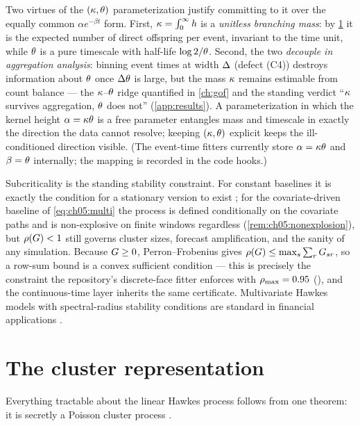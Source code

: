 Two virtues of the $(\kappa,\theta)$ parameterization justify committing
to it over the equally common $\alpha e^{-\beta t}$ form. First,
$\kappa = \int_0^\infty h$ is a \emph{unitless branching mass}: by
\cref{ch05:sec:cluster} it is the expected number of direct offspring per
event, invariant to the time unit, while $\theta$ is a pure timescale with
half-life $\log 2/\theta$. Second, the two \emph{decouple in aggregation
analysis}: binning event times at width $\Delta$ (defect (C4)) destroys
information about $\theta$ once $\Delta\theta$ is large, but the mass
$\kappa$ remains estimable from count balance --- the
$\kappa$--$\theta$ ridge quantified in \cref{ch:gof} and the standing
verdict ``$\kappa$ survives aggregation, $\theta$ does not''
(\cref{app:results}). A parameterization in which the kernel height
$\alpha = \kappa\theta$ is a free parameter entangles mass and timescale
in exactly the direction the data cannot resolve; keeping
$(\kappa,\theta)$ explicit keeps the ill-conditioned direction visible.
(The event-time fitters currently store $\alpha=\kappa\theta$ and $\beta
= \theta$ internally; the mapping is recorded in the code hooks.)

Subcriticality is the standing stability constraint. For constant
baselines it is exactly the condition for a stationary version to exist
\citep{hawkes1971,bremaud1996}; for the covariate-driven baseline of
\cref{eq:ch05:multi} the process is defined conditionally on the covariate
paths and is non-explosive on finite windows regardless
(\cref{rem:ch05:nonexplosion}), but $\rho\!\left(G\right)<1$ still governs
cluster sizes, forecast amplification, and the sanity of any simulation.
Because $G \ge 0$, Perron--Frobenius gives $\rho\!\left(G\right) \le \max_s
\sum_r G_{sr}$, so a row-sum bound is a convex sufficient condition
--- this is precisely the constraint the repository's discrete-face fitter
enforces with $\rho_{\max} = 0.95$ (), and the
continuous-time layer inherits the same certificate. Multivariate Hawkes
models with spectral-radius stability conditions are standard in financial
applications \citep{embrechts2011,bacry2015}.

\section{The cluster representation}\label{ch05:sec:cluster}

Everything tractable about the linear Hawkes process follows from one
theorem: it is secretly a Poisson cluster process
\citep{hawkesoakes1974}.

